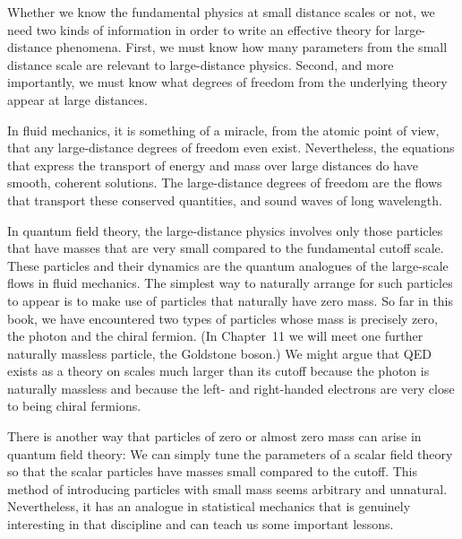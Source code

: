 Whether we know the fundamental physics at small distance scales or not, we
need two kinds of information in order to write an effective theory for
large-distance phenomena.  First, we must know how many parameters from the
small distance scale are relevant to large-distance physics.  Second, and more
importantly, we must know what degrees of freedom from the underlying theory
appear at large distances.

In fluid mechanics, it is something of a miracle, from the atomic point of
view, that any large-distance degrees of freedom even exist.  Nevertheless, the
equations that express the transport of energy and mass over large distances
do have smooth, coherent solutions.  The large-distance degrees of freedom are
the flows that transport these conserved quantities, and sound waves of long
wavelength.

In quantum field theory, the large-distance physics involves only those
particles that have masses that are very small compared to the fundamental
cutoff scale.  These particles and their dynamics are the quantum analogues of
the large-scale flows in fluid mechanics.  The simplest way to naturally
arrange for such particles to appear is to make use of particles that
naturally have zero mass.  So far in this book, we have encountered two types
of particles whose mass is precisely zero, the photon and the chiral fermion.
(In Chapter~11 we will meet one further naturally massless particle, the
Goldstone boson.)  We might argue that QED exists as a theory on scales much
larger than its cutoff because the photon is naturally massless and because
the left- and right-handed electrons are very close to being chiral fermions.

There is another way that particles of zero or almost zero mass can arise in
quantum field theory: We can simply tune the parameters of a scalar field
theory so that the scalar particles have masses small compared to the cutoff.
This method of introducing particles with small mass seems arbitrary and
unnatural.  Nevertheless, it has an analogue in statistical mechanics that is
genuinely interesting in that discipline and can teach us some important
lessons.

